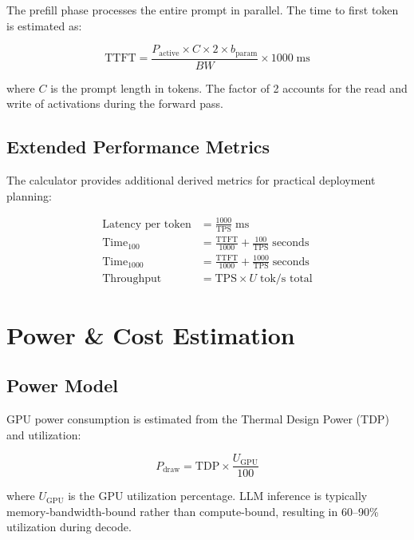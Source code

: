 \documentclass[11pt,a4paper]{article}
\theoremstyle{definition}
\begin{document}
The prefill phase processes the entire prompt in parallel. The time to first token is estimated as:

\begin{equation}\label{eq:ttft}
\text{TTFT} = \frac{P_{\text{active}} \times C \times 2 \times b_{\text{param}}}{BW} \times 1000 \;\text{ms}
\end{equation}

where $C$ is the prompt length in tokens. The factor of 2 accounts for the read and write of activations during the forward pass.

\subsection{Extended Performance Metrics}

The calculator provides additional derived metrics for practical deployment planning:

\begin{align}
\text{Latency per token} &= \frac{1000}{\text{TPS}} \;\text{ms} \label{eq:latency} \\
\text{Time}_{100} &= \frac{\text{TTFT}}{1000} + \frac{100}{\text{TPS}} \;\text{seconds} \label{eq:t100} \\
\text{Time}_{1000} &= \frac{\text{TTFT}}{1000} + \frac{1000}{\text{TPS}} \;\text{seconds} \label{eq:t1000} \\
\text{Throughput} &= \text{TPS} \times U \;\text{tok/s total} \label{eq:throughput}
\end{align}

\section{Power \& Cost Estimation}

\subsection{Power Model}

GPU power consumption is estimated from the Thermal Design Power (TDP) and utilization:

\begin{equation}\label{eq:power}
P_{\text{draw}} = \text{TDP} \times \frac{U_{\text{GPU}}}{100}
\end{equation}

where $U_{\text{GPU}}$ is the GPU utilization percentage. LLM inference is typically memory-bandwidth-bound rather than compute-bound, resulting in 60--90\% utilization during decode.
\end{document}
